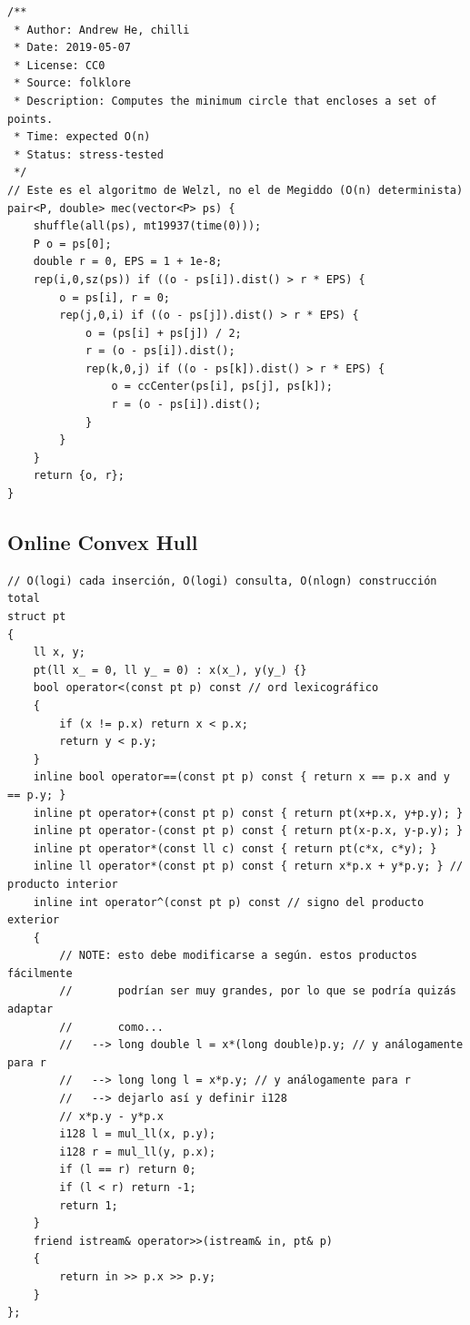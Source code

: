 \documentclass[twoside]{article}
\begin{document}
\begin{multicols*}{2}
\begin{verbatim}
/**
 * Author: Andrew He, chilli
 * Date: 2019-05-07
 * License: CC0
 * Source: folklore
 * Description: Computes the minimum circle that encloses a set of points.
 * Time: expected O(n)
 * Status: stress-tested
 */
// Este es el algoritmo de Welzl, no el de Megiddo (O(n) determinista)
pair<P, double> mec(vector<P> ps) {
	shuffle(all(ps), mt19937(time(0)));
	P o = ps[0];
	double r = 0, EPS = 1 + 1e-8;
	rep(i,0,sz(ps)) if ((o - ps[i]).dist() > r * EPS) {
		o = ps[i], r = 0;
		rep(j,0,i) if ((o - ps[j]).dist() > r * EPS) {
			o = (ps[i] + ps[j]) / 2;
			r = (o - ps[i]).dist();
			rep(k,0,j) if ((o - ps[k]).dist() > r * EPS) {
				o = ccCenter(ps[i], ps[j], ps[k]);
				r = (o - ps[i]).dist();
			}
		}
	}
	return {o, r};
}

\end{verbatim}

	{
		\subsection*{Online Convex Hull}
	}
	\begin{verbatim}
// O(logi) cada inserción, O(logi) consulta, O(nlogn) construcción total
struct pt
{
    ll x, y;
    pt(ll x_ = 0, ll y_ = 0) : x(x_), y(y_) {}
    bool operator<(const pt p) const // ord lexicográfico
    {
        if (x != p.x) return x < p.x;
        return y < p.y;
    }
    inline bool operator==(const pt p) const { return x == p.x and y == p.y; }
    inline pt operator+(const pt p) const { return pt(x+p.x, y+p.y); }
    inline pt operator-(const pt p) const { return pt(x-p.x, y-p.y); }
    inline pt operator*(const ll c) const { return pt(c*x, c*y); }
    inline ll operator*(const pt p) const { return x*p.x + y*p.y; } // producto interior
    inline int operator^(const pt p) const // signo del producto exterior
    {
        // NOTE: esto debe modificarse a según. estos productos fácilmente
        //       podrían ser muy grandes, por lo que se podría quizás adaptar
        //       como...
        //   --> long double l = x*(long double)p.y; // y análogamente para r
        //   --> long long l = x*p.y; // y análogamente para r
        //   --> dejarlo así y definir i128
        // x*p.y - y*p.x
        i128 l = mul_ll(x, p.y);
        i128 r = mul_ll(y, p.x);
        if (l == r) return 0;
        if (l < r) return -1;
        return 1;
    }
    friend istream& operator>>(istream& in, pt& p)
    {
        return in >> p.x >> p.y;
    }
};


\end{verbatim}
\end{multicols*}
\end{document}
